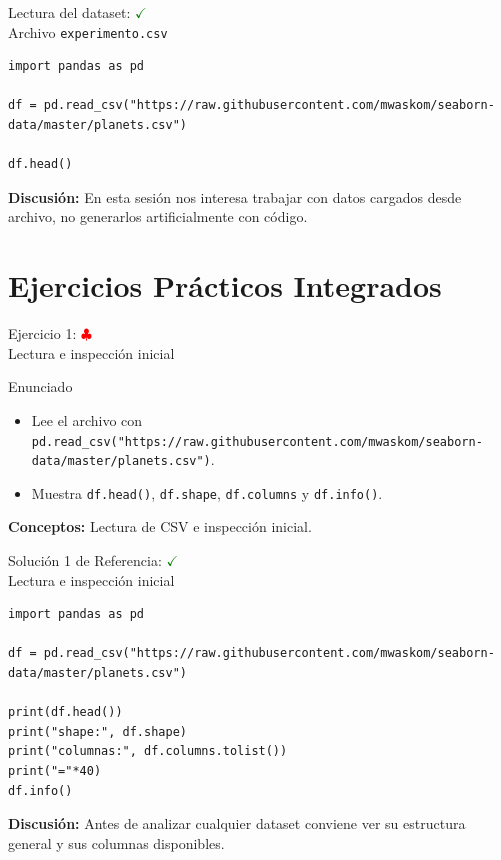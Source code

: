 \documentclass[10pt]{beamer}
\begin{document}
\begin{frame}[fragile]{Lectura del dataset: \hfill \textcolor{green}{$\checkmark$} \\ Archivo \texttt{experimento.csv}}
\begin{verbatim}
import pandas as pd

df = pd.read_csv("https://raw.githubusercontent.com/mwaskom/seaborn-data/master/planets.csv")

df.head()
\end{verbatim}
\textbf{Discusión:} En esta sesión nos interesa trabajar con datos cargados desde archivo, no generarlos artificialmente con código.
\end{frame}

\section{Ejercicios Prácticos Integrados}

\begin{frame}{Ejercicio 1: \hfill \textcolor{red}{$\clubsuit$} \\ Lectura e inspección inicial}
  \begin{block}{Enunciado}
    \begin{itemize}
      \item Lee el archivo con \texttt{pd.read\_csv("https://raw.githubusercontent.com/mwaskom/seaborn-data/master/planets.csv")}.
      \item Muestra \texttt{df.head()}, \texttt{df.shape}, \texttt{df.columns} y \texttt{df.info()}.
    \end{itemize}
  \end{block}
  \textbf{Conceptos:} Lectura de CSV e inspección inicial.
\end{frame}

\begin{solutionblock}
\begin{frame}[fragile]{Solución 1 de Referencia: \hfill \textcolor{green}{$\checkmark$} \\ Lectura e inspección inicial}
\begin{verbatim}
import pandas as pd

df = pd.read_csv("https://raw.githubusercontent.com/mwaskom/seaborn-data/master/planets.csv")

print(df.head())
print("shape:", df.shape)
print("columnas:", df.columns.tolist())
print("="*40)
df.info()
\end{verbatim}
\textbf{Discusión:} Antes de analizar cualquier dataset conviene ver su estructura general y sus columnas disponibles.
\end{frame}
\end{solutionblock}
\end{document}
